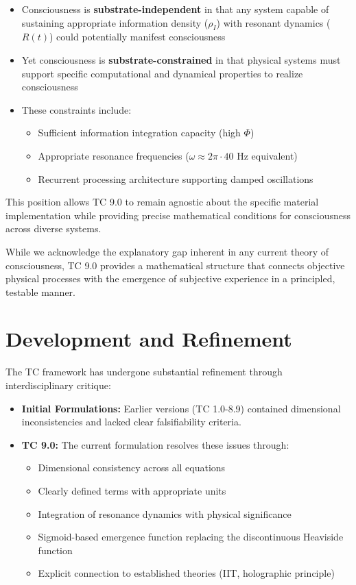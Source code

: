 \documentclass[12pt]{article}
\begin{document}
\begin{itemize}
    \item Consciousness is \textbf{substrate-independent} in that any system capable of sustaining appropriate information density ($\rho_I$) with resonant dynamics ($R(t)$) could potentially manifest consciousness
    
    \item Yet consciousness is \textbf{substrate-constrained} in that physical systems must support specific computational and dynamical properties to realize consciousness
    
    \item These constraints include:
    \begin{itemize}[label=--]
        \item Sufficient information integration capacity (high $\Phi$)
        \item Appropriate resonance frequencies ($\omega \approx 2\pi \cdot 40$ Hz equivalent)
        \item Recurrent processing architecture supporting damped oscillations
    \end{itemize}
\end{itemize}

This position allows TC 9.0 to remain agnostic about the specific material implementation while providing precise mathematical conditions for consciousness across diverse systems.

While we acknowledge the explanatory gap inherent in any current theory of consciousness, TC 9.0 provides a mathematical structure that connects objective physical processes with the emergence of subjective experience in a principled, testable manner.

\section{Development and Refinement}
The TC framework has undergone substantial refinement through interdisciplinary critique:

\begin{itemize}
    \item \textbf{Initial Formulations:} Earlier versions (TC 1.0-8.9) contained dimensional inconsistencies and lacked clear falsifiability criteria.
    
    \item \textbf{TC 9.0:} The current formulation resolves these issues through:
    \begin{itemize}[label=--]
        \item Dimensional consistency across all equations
        \item Clearly defined terms with appropriate units
        \item Integration of resonance dynamics with physical significance
        \item Sigmoid-based emergence function replacing the discontinuous Heaviside function
        \item Explicit connection to established theories (IIT, holographic principle)
    \end{itemize}
\end{itemize}
\end{document}
